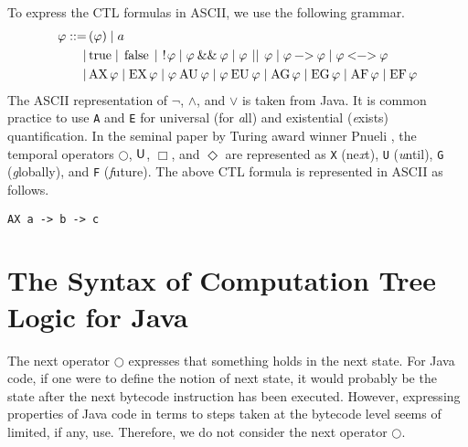 \documentclass[12pt]{article}
\newcommand{\always}{\Box}
\newcommand{\eventually}{\Diamond}
\newcommand{\nxt}{\bigcirc}
\newcommand{\until}{\mathbin{\sf U}}
\newcommand{\TRUE}{\mbox{\lstinline{true}}}
\newcommand{\FALSE}{\mbox{\lstinline{false}}}
\newcommand{\NOT}{\mbox{\lstinline{!}}}
\newcommand{\AND}{\mathbin{\mbox{\lstinline{\&\&}}}}
\newcommand{\OR}{\mathbin{\mbox{\lstinline{||}}}}
\newcommand{\IMPLIES}{\mathbin{\mbox{\lstinline{->}}}}
\newcommand{\IFF}{\mathbin{\mbox{\lstinline{<->}}}}
\newcommand{\AX}{\mbox{\lstinline{AX}\,}}
\newcommand{\EX}{\mbox{\lstinline{EX}\,}}
\newcommand{\AG}{\mbox{\lstinline{AG}\,}}
\newcommand{\EG}{\mbox{\lstinline{EG}\,}}
\newcommand{\AF}{\mbox{\lstinline{AF}\,}}
\newcommand{\EF}{\mbox{\lstinline{EF}\,}}
\newcommand{\AU}{\mathbin{\mbox{\lstinline{AU}}}}
\newcommand{\EU}{\mathbin{\mbox{\lstinline{EU}}}}
\theoremstyle{definition}
\begin{document}
To express the CTL formulas in ASCII, we use the following grammar.
\begin{align*}
\varphi
::= \, & ( \varphi ) 
\mid a\\
\mid\, & \TRUE
\mid \FALSE
\mid \NOT \varphi
\mid \varphi \AND \varphi
\mid \varphi \OR \varphi
\mid \varphi \IMPLIES \varphi
\mid \varphi \IFF \varphi\\
\mid \, & \AX \varphi
\mid \EX \varphi
\mid  \varphi \AU \varphi
\mid \varphi \EU \varphi
\mid \AG \varphi
\mid \EG \varphi
\mid \AF \varphi
\mid \EF \varphi
\end{align*}
The ASCII representation of $\neg$, $\wedge$, and $\vee$ is taken from Java.  It is common practice to use \lstinline{A} and \lstinline{E} for universal (for \emph{a}ll) and existential (\emph{e}xists) quantification.  In the seminal paper by Turing award winner Pnueli \cite{P77}, the temporal operators $\nxt$, $\until$, $\always$, and $\eventually$ are represented as \lstinline{X} (ne\emph{x}t), \lstinline{U} (\emph{u}ntil), \lstinline{G} (\emph{g}lobally), and \lstinline{F} (\emph{f}uture).  The above CTL formula is represented in ASCII as follows.
\begin{center}
\lstinline{AX a -> b -> c}
\end{center}

\section{The Syntax of Computation Tree Logic for Java}

The next operator $\nxt$ expresses that something holds in the next state.  For Java code, if one were to define the notion of next state, it would probably be the state after the next bytecode instruction has been executed.   However, expressing properties of Java code in terms to steps taken at the bytecode level seems of limited, if any, use.  Therefore, we do not consider the next operator $\nxt$.
\end{document}
